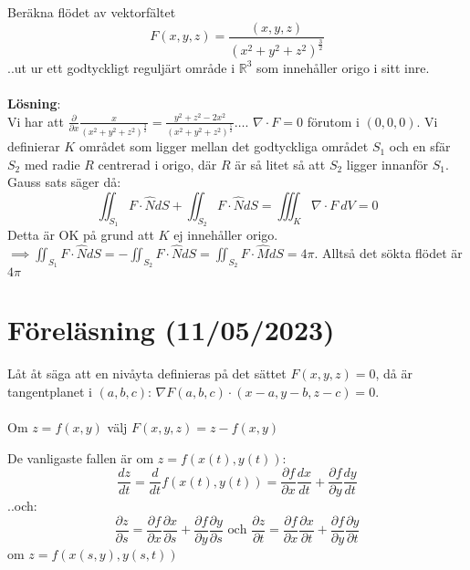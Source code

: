 \documentclass{report}
\begin{document}
\ex{}
{
Beräkna flödet av vektorfältet
\begin{equation*}
	F(x,y,z) = \frac{(x,y,z)}{(x^2+y^2+z^2)^{ \frac{3}{2}  }} 
\end{equation*}
..ut ur ett godtyckligt reguljärt område i $ \mathbb{R}^3 $ som innehåller origo i sitt inre.\\\\

\textbf{Lösning}:\\
Vi har att $ \frac{\partial  }{\partial x } \frac{x}{(x^2+y^2+z^2)^{ \frac{3}{2}  }} = \frac{y^2+z^2-2x^2}{(x^2+y^2+z^2)^{ \frac{5}{2}  }} \ldots  $. $ \nabla \cdot F = 0 $ förutom i $ (0,0,0) $. Vi definierar $ K $ området som ligger mellan det godtyckliga området $ S_1 $ och en sfär $ S_2 $  med radie $ R $ centrerad i origo, där $ R $ är så litet så att $ S_2 $ ligger innanför $ S_1 $. Gauss sats säger då:
\begin{equation*}
	\iint_{S_1} F \cdot \hat{N} dS + \iint_{S_2} F \cdot \hat{N} dS = \iiint_{K} \nabla \cdot F \: dV = 0 
\end{equation*}
	Detta är OK på grund att $ K $ ej innehåller origo. $ \implies \iint_{S_1} F \cdot \hat{N} dS = - \iint_{S_2} F \cdot \hat{N} dS = \iint_{S_2} F \cdot \hat{M} dS = 4\pi$. Alltså det sökta flödet är $ 4\pi $
}


\pagebreak
\section{Föreläsning (11/05/2023)}

{
Låt åt säga att en nivåyta definieras på det sättet $ F(x,y,z) = 0 $, då är tangentplanet i $ (a,b,c) $: $ \nabla F(a,b,c) \cdot (x-a,y-b,z-c) = 0 $.\\\\

Om $ z = f(x,y) $ välj $ F(x,y,z) = z - f(x,y) $    
}

{
De vanligaste fallen är om $ z = f(x(t), y(t)) $:
\begin{equation*}
\frac{dz}{dt} = \frac{d}{dt}f(x(t),y(t)) = \frac{\partial f }{\partial x } \frac{dx}{dt} + \frac{\partial f }{\partial y } \frac{dy}{dt}
\end{equation*}
..och:
\begin{equation*}
\frac{\partial z }{\partial s } = \frac{\partial f }{\partial x } \frac{\partial x }{\partial s } + \frac{\partial f }{\partial y } \frac{\partial y }{\partial s } \text{ och } \frac{\partial z }{\partial t } = \frac{\partial f }{\partial x } \frac{\partial x }{\partial t } + \frac{\partial f }{\partial y } \frac{\partial y }{\partial t } 
\end{equation*}
om $ z = f(x(s,y),y(s,t)) $ 
}
\end{document}
